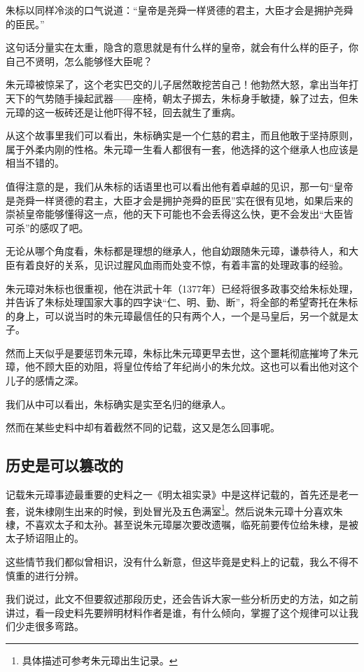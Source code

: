 \begin{multicols}{\theparacolNo}
		朱标以同样冷淡的口气说道：“皇帝是尧舜一样贤德的君主，大臣才会是拥护尧舜的臣民。”

		这句话分量实在太重，隐含的意思就是有什么样的皇帝，就会有什么样的臣子，你自己不贤明，怎么能够怪大臣呢？

		朱元璋被惊呆了，这个老实巴交的儿子居然敢挖苦自己！他勃然大怒，拿出当年打天下的气势随手操起武器——座椅，朝太子掷去，朱标身手敏捷，躲了过去，但朱元璋的这一板砖还是让他吓得不轻，回去就生了重病。

		从这个故事里我们可以看出，朱标确实是一个仁慈的君主，而且他敢于坚持原则，属于外柔内刚的性格。朱元璋一生看人都很有一套，他选择的这个继承人也应该是相当不错的。

		值得注意的是，我们从朱标的话语里也可以看出他有着卓越的见识，那一句“皇帝是尧舜一样贤德的君主，大臣才会是拥护尧舜的臣民”实在很有见地，如果后来的崇祯皇帝能够懂得这一点，他的天下可能也不会丢得这么快，更不会发出“大臣皆可杀”的感叹了吧。

		无论从哪个角度看，朱标都是理想的继承人，他自幼跟随朱元璋，谦恭待人，和大臣有着良好的关系，见识过腥风血雨而处变不惊，有着丰富的处理政事的经验。

		朱元璋对朱标也很重视，他在洪武十年（1377年）已经将很多政事交给朱标处理，并告诉了朱标处理国家大事的四字诀“仁、明、勤、断”，将全部的希望寄托在朱标的身上，可以说当时的朱元璋最信任的只有两个人，一个是马皇后，另一个就是太子。

		然而上天似乎是要惩罚朱元璋，朱标比朱元璋更早去世，这个噩耗彻底摧垮了朱元璋，他不顾大臣的劝阻，将皇位传给了年纪尚小的朱允炆。这也可以看出他对这个儿子的感情之深。

		我们从中可以看出，朱标确实是实至名归的继承人。

		然而在某些史料中却有着截然不同的记载，这又是怎么回事呢。

		\subsection{历史是可以篡改的}
		记载朱元璋事迹最重要的史料之一《明太祖实录》中是这样记载的，首先还是老一套，说朱棣刚生出来的时候，到处冒光及五色满室\footnote{具体描述可参考朱元璋出生记录。}。然后说朱元璋十分喜欢朱棣，不喜欢太子和太孙。甚至说朱元璋屡次要改遗嘱，临死前要传位给朱棣，是被太子矫诏阻止的。

		这些情节我们都似曾相识，没有什么新意，但这毕竟是史料上的记载，我么不得不慎重的进行分辨。

		我们说过，此文不但要叙述那段历史，还会告诉大家一些分析历史的方法，如之前讲过，看一段史料先要辨明材料作者是谁，有什么倾向，掌握了这个规律可以让我们少走很多弯路。


\end{multicols}
